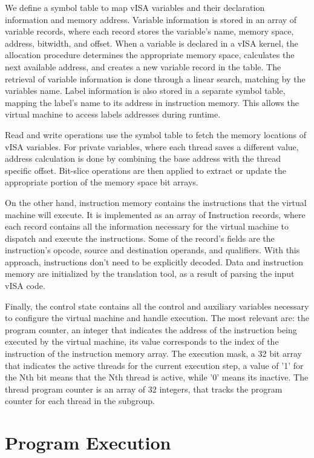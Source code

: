 We define a symbol table to map vISA variables and their declaration
information and memory address. Variable information is stored in an array of
variable records, where each record stores the variable's name, memory space,
address, bitwidth, and offset. When a variable is declared in a vISA kernel,
the allocation procedure determines the appropriate memory space, calculates
the next available address, and creates a new variable record in the table. The
retrieval of variable information is done through a linear search, matching by
the variables name. Label information is also stored in a separate symbol
table, mapping the label's name to its address in instruction memory. This
allows the virtual machine to access labels addresses during runtime.

Read and write operations use the symbol table to fetch the memory locations of
vISA variables. For private variables, where each thread saves a different
value, address calculation is done by combining the base address with the
thread specific offset. Bit-slice operations are then applied to extract or
update the appropriate portion of the memory space bit arrays.

On the other hand, instruction memory contains the instructions that the
virtual machine will execute. It is implemented as an array of Instruction
records, where each record contains all the information necessary for the
virtual machine to dispatch and execute the instructions. Some of the record's
fields are the instruction's opcode, source and destination operands, and
qualifiers. With this approach, instructions don't need to be explicitly
decoded. Data and instruction memory are initialized by the translation tool,
as a result of parsing the input vISA code.

Finally, the control state contains all the control and auxiliary variables
necessary to configure the virtual machine and handle execution. The most
relevant are: the program counter, an integer that indicates the address of the
instruction being executed by the virtual machine, its value corresponds to the
index of the instruction of the instruction memory array. The execution mask, a
32 bit array that indicates the active threads for the current execution step,
a value of '1' for the Nth bit means that the Nth thread is active, while '0'
means its inactive. The thread program counter is an array of 32 integers, that
tracks the program counter for each thread in the subgroup.

\section{Program Execution}


